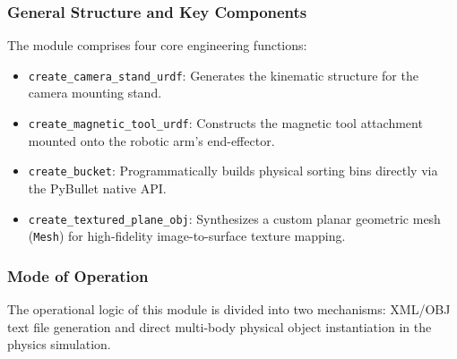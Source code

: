 \documentclass{article}
\begin{document}
\subsubsection{General Structure and Key Components}
The module comprises four core engineering functions:

\begin{itemize}
	\item \texttt{create\_camera\_stand\_urdf}: Generates the kinematic structure for the camera mounting stand.
	\item \texttt{create\_magnetic\_tool\_urdf}: Constructs the magnetic tool attachment mounted onto the robotic arm's end-effector.
	\item \texttt{create\_bucket}: Programmatically builds physical sorting bins directly via the PyBullet native API.
	\item \texttt{create\_textured\_plane\_obj}: Synthesizes a custom planar geometric mesh (\texttt{Mesh}) for high-fidelity image-to-surface texture mapping.
\end{itemize}

\subsubsection{Mode of Operation}
The operational logic of this module is divided into two mechanisms: XML/OBJ text file generation and direct multi-body physical object instantiation in the physics simulation.
\end{document}
